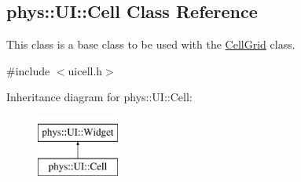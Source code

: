 \hypertarget{classphys_1_1UI_1_1Cell}{
\subsection{phys::UI::Cell Class Reference}
\label{classphys_1_1UI_1_1Cell}
}


This class is a base class to be used with the \hyperlink{classphys_1_1UI_1_1CellGrid}{CellGrid} class.  




{\ttfamily \#include $<$uicell.h$>$}

Inheritance diagram for phys::UI::Cell:\begin{figure}[H]
\begin{center}
\leavevmode
\includegraphics[height=2.000000cm]{classphys_1_1UI_1_1Cell}
\end{center}
\end{figure}
